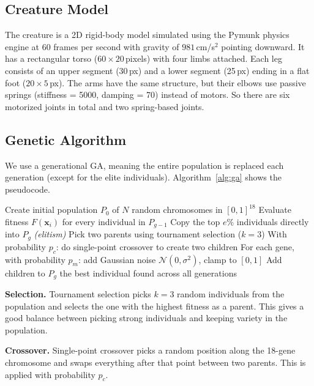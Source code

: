 \documentclass[11pt,a4paper]{article}
\begin{document}
\subsection{Creature Model}

The creature is a 2D rigid-body model simulated using the Pymunk physics engine at 60 frames per second with gravity of $981$\,cm/s$^2$ pointing downward. It has a rectangular torso ($60 \times 20$\,pixels) with four limbs attached. Each leg consists of an upper segment (30\,px) and a lower segment (25\,px) ending in a flat foot ($20 \times 5$\,px). The arms have the same structure, but their elbows use passive springs (stiffness = 5000, damping = 70) instead of motors. So there are six motorized joints in total and two spring-based joints.

\subsection{Genetic Algorithm}

We use a generational GA, meaning the entire population is replaced each generation (except for the elite individuals). Algorithm~\ref{alg:ga} shows the pseudocode.

\begin{algorithm}[H]
\caption{Generational Genetic Algorithm}\label{alg:ga}
\small
\begin{algorithmic}[1]
\State Create initial population $P_0$ of $N$ random chromosomes in $[0,1]^{18}$
    \State Evaluate fitness $F(\mathbf{x}_i)$ for every individual in $P_{g-1}$
    \State Copy the top $e\%$ individuals directly into $P_g$ \hfill\textit{(elitism)}
        \State Pick two parents using tournament selection ($k{=}3$)
        \State With probability $p_c$: do single-point crossover to create two children
        \State For each gene, with probability $p_m$: add Gaussian noise $\mathcal{N}(0,\sigma^2)$, clamp to $[0,1]$
        \State Add children to $P_g$
    \EndWhile
\EndFor
\State \Return the best individual found across all generations
\end{algorithmic}
\end{algorithm}

\textbf{Selection.} Tournament selection picks $k = 3$ random individuals from the population and selects the one with the highest fitness as a parent. This gives a good balance between picking strong individuals and keeping variety in the population.

\textbf{Crossover.} Single-point crossover picks a random position along the 18-gene chromosome and swaps everything after that point between two parents. This is applied with probability $p_c$.
\end{document}
